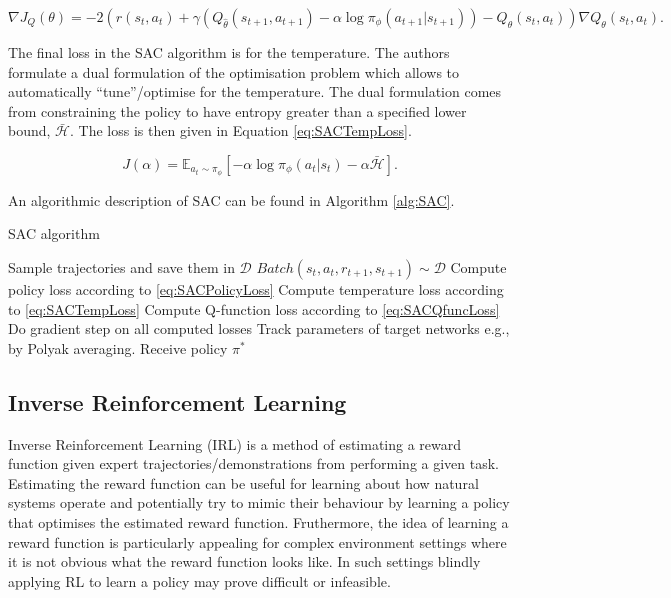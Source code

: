\documentclass{report}
\numberwithin{equation}{section}
\numberwithin{figure}{section}
\numberwithin{table}{section}
\numberwithin{algorithm}{section}
\begin{document}
\begin{equation}\label{eq:SACQgrad}
  \nabla J_Q(\theta)=-2\left(
    r(s_t,a_t) + \gamma(
      Q_{\hat{\theta}}(s_{t+1},a_{t+1}) - \alpha \log \pi_\phi(a_{t+1}|s_{t+1})
    )
    - Q_\theta(s_t, a_t)
  \right)\nabla Q_\theta(s_t, a_t).
\end{equation}

The final loss in the SAC algorithm is for the temperature. 
The authors formulate a dual formulation of the optimisation 
problem which allows to automatically ``tune''/optimise for 
the temperature. The dual formulation comes from constraining 
the policy to have entropy greater than a specified lower 
bound, $\bar{\mathcal{H}}$.
The loss is then given in Equation \ref{eq:SACTempLoss}.

\begin{equation}\label{eq:SACTempLoss}
  J(\alpha)=\mathbb{E}_{a_t\sim \pi_\phi}[-\alpha \log \pi_\phi(a_t|s_t) - \alpha \bar{\mathcal{H}}].
\end{equation}

An algorithmic description of SAC can be found in Algorithm 
\ref{alg:SAC}.

\begin{algorithm}
  \caption{SAC algorithm}
  \label{alg:SAC}
  \begin{algorithmic}
        \State Sample trajectories and save them in $\mathcal{D}$
          \State $Batch(s_t, a_t, r_{t+1}, s_{t+1})\sim\mathcal{D}$
          \State Compute policy loss according to \ref{eq:SACPolicyLoss}
          \State Compute temperature loss according to \ref{eq:SACTempLoss}
          \State Compute Q-function loss according to \ref{eq:SACQfuncLoss}
          \State Do gradient step on all computed losses
          \State Track parameters of target networks e.g., by Polyak averaging.
        \EndFor
      \EndFor
    \EndFor
    \State Receive policy $\pi^*$
  \end{algorithmic}
\end{algorithm}



\subsection{Inverse Reinforcement Learning}\label{sec:IRL}
Inverse Reinforcement Learning (IRL) is a method of estimating 
a reward function given expert trajectories/demonstrations 
from performing a given task. Estimating the reward function can be 
useful for learning about how natural systems operate and potentially 
try to mimic their behaviour by learning a policy that 
optimises the 
estimated reward function. Fruthermore, the idea of learning a 
reward function 
is particularly appealing for complex environment settings 
where it is not obvious what the reward function looks like. 
In such settings blindly applying RL to learn a policy may 
prove difficult or infeasible. 
\end{document}

